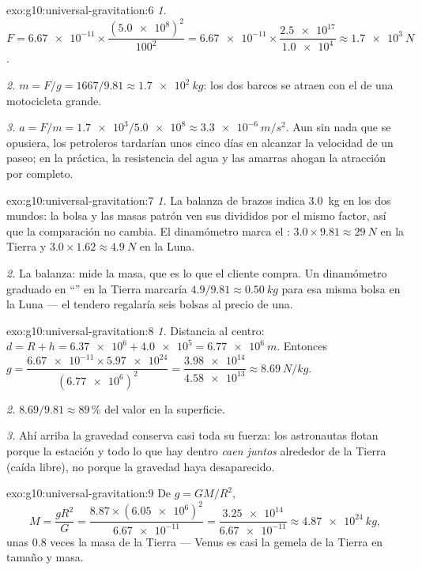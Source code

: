 \begin{solution}{exo:g10:universal-gravitation:6}
\emph{1.} $F = \num{6.67e-11} \times
\dfrac{(\num{5.0e8})^2}{100^2}
= \num{6.67e-11} \times \dfrac{\num{2.5e17}}{\num{1.0e4}}
\approx \qty{1.7e3}{N}$.

\emph{2.} $m = F/g = 1667/9.81 \approx \qty{1.7e2}{kg}$: los dos barcos
se atraen con el  de una motocicleta grande.

\emph{3.} $a = F/m = \num{1.7e3}/\num{5.0e8} \approx
\qty{3.3e-6}{m/s^2}$. Aun sin nada que se opusiera, los petroleros
tardarían unos cinco días en alcanzar la velocidad de un paseo; en la
práctica, la resistencia del agua y las amarras ahogan la atracción por
completo.
\end{solution}

\begin{solution}{exo:g10:universal-gravitation:7}
\emph{1.} La balanza de brazos indica \qty{3.0}{kg} en los dos mundos:
la bolsa y las masas patrón ven sus  divididos por el mismo factor,
así que la comparación no cambia. El dinamómetro marca el :
$3.0 \times 9.81 \approx \qty{29}{N}$ en la Tierra y
$3.0 \times 1.62 \approx \qty{4.9}{N}$ en la Luna.

\emph{2.} La balanza: mide la masa, que es lo que el cliente compra. Un
dinamómetro graduado en ``'' en la Tierra marcaría
$4.9/9.81 \approx \qty{0.50}{kg}$ para esa misma bolsa en la Luna --- el
tendero regalaría seis bolsas al precio de una.
\end{solution}

\begin{solution}{exo:g10:universal-gravitation:8}
\emph{1.} Distancia al centro:
$d = R + h = \num{6.37e6} + \num{4.0e5} = \qty{6.77e6}{m}$. Entonces
$g = \dfrac{\num{6.67e-11} \times \num{5.97e24}}{(\num{6.77e6})^2}
= \dfrac{\num{3.98e14}}{\num{4.58e13}} \approx \qty{8.69}{N/kg}$.

\emph{2.} $8.69/9.81 \approx 89\,\%$ del valor en la superficie.

\emph{3.} Ahí arriba la gravedad conserva casi toda su fuerza: los
astronautas flotan porque la estación y todo lo que hay dentro
\emph{caen juntos} alrededor de la Tierra (caída libre), no porque la
gravedad haya desaparecido.
\end{solution}

\begin{solution}{exo:g10:universal-gravitation:9}
De $g = GM/R^2$,
\[
M = \frac{g R^2}{G}
= \frac{8.87 \times (\num{6.05e6})^2}{\num{6.67e-11}}
= \frac{\num{3.25e14}}{\num{6.67e-11}}
\approx \qty{4.87e24}{kg},
\]
unas $0.8$ veces la masa de la Tierra --- Venus es casi la gemela de la
Tierra en tamaño y masa.
\end{solution}


